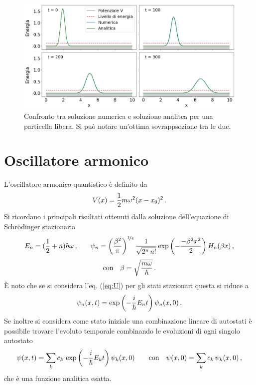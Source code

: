\begin{figure}
    \centering
    \includegraphics[width = \textwidth]{immagini/free_ev.png}
    \caption{Confronto tra soluzione numerica e soluzione analitca per una particella libera. Si può notare un'ottima sovrappsozione tra le due.}
    \label{fig:free_ev}
\end{figure}


\section{Oscillatore armonico}
\label{sec:arm}

L'oscillatore armonico quantistico è definito da 
\begin{equation}
    \centering
    V(x) = \frac{1}{2} m \omega^2 (x -x_0)^2 \, \text{.}
\end{equation}
Si ricordano i principali risultati ottenuti dalla soluzione dell'equazione di Schr\"odinger stazionaria
\begin{equation}
    \centering
    E_n = (\frac{1}{2} + n) \hbar \omega \, \text{,} \qquad \psi_{n} = \left( \frac{\beta^2}{\pi} \right)^{\nicefrac{1}{4}} \frac{1}{\sqrt{2^{n} \, n!}} \exp \left(-\frac{- \beta^2 x^2}{2}\right) H_{n}(\beta x) \, \text{,}
    \label{eq:arm_res}
\end{equation}
\begin{equation}
    \centering
    \text{con}  \quad \beta = \sqrt{\frac{m \omega}{\hbar}} \, \text{.}
\end{equation}
È noto che se si considera l'eq. (\ref{eq:U}) per gli stati stazionari questa si riduce a 
\begin{equation}
    \centering
    \psi_{n}(x, t) = \exp \left( - \frac{i}{\hbar} E_n t \right) \psi_{n} (x,0)      \, \text{.}
    \label{eq:ev_eigenstate}
\end{equation}
Se inoltre si considera come stato iniziale una combinazione lineare di autostati è possibile trovare l'evoluto temporale combinando le evoluzioni di ogni singolo autostato
\begin{equation}
    \centering
    \psi(x, t) = \sum_{k} c_{k} \, \exp \left( - \frac{i}{\hbar} E_k t \right) \psi_k (x,0) \qquad \text{con} \quad\psi(x,0) = \sum_{k} c_{k} \,  \psi_k (x,0)        \, \text{,}
    \label{eq:ev_combinazione}
\end{equation}
che è una funzione analitica esatta.

